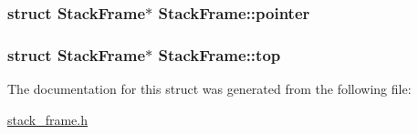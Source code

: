 \subsubsection[{\texorpdfstring{pointer}{pointer}}]{\setlength{\rightskip}{0pt plus 5cm}struct {\bf Stack\+Frame}$\ast$ Stack\+Frame\+::pointer}\hypertarget{structStackFrame_aae670075795a607599420fd8b5181292}{}\label{structStackFrame_aae670075795a607599420fd8b5181292}
\subsubsection[{\texorpdfstring{top}{top}}]{\setlength{\rightskip}{0pt plus 5cm}struct {\bf Stack\+Frame}$\ast$ Stack\+Frame\+::top}\hypertarget{structStackFrame_a9f0df83101cacbe812d0d4b3c6e08494}{}\label{structStackFrame_a9f0df83101cacbe812d0d4b3c6e08494}


The documentation for this struct was generated from the following file\+:\begin{DoxyCompactItemize}
\item 
\hyperlink{stack__frame_8h}{stack\+\_\+frame.\+h}\end{DoxyCompactItemize}
